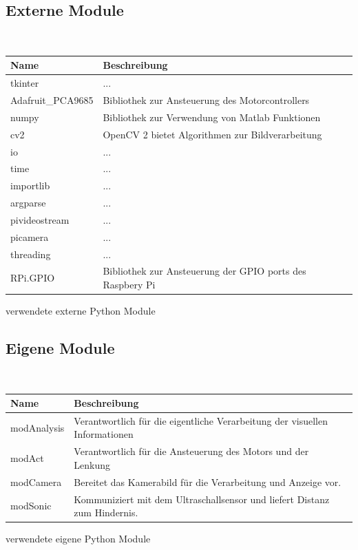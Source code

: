 \documentclass[a4paper,12pt]{article}
\begin{document}
    \subsection{Externe Module}
    \ \\
    \begin{minipage}{\columnwidth}
      \makeatletter
      \def\@captype{table}
      \makeatother
      \centering
      \begin{tabular}{ l | l }
      Name & Beschreibung \\ \hline \hline
      tkinter & ... \\
      Adafruit\_PCA9685 & Bibliothek zur Ansteuerung des Motorcontrollers \\
      numpy & Bibliothek zur Verwendung von Matlab Funktionen \\
      cv2 & OpenCV 2 bietet Algorithmen zur Bildverarbeitung \\
      io & ... \\
      time & ... \\
      importlib & ... \\
      argparse & ... \\
      pivideostream & ... \\
      picamera & ... \\
      threading & ... \\
      RPi.GPIO & Bibliothek zur Ansteuerung der GPIO ports des Raspbery Pi \\
      \end{tabular}
      \caption{verwendete externe Python Module}
      \label{tab:01}
    \end{minipage}
    
    \subsection{Eigene Module}
    \ \\
    \begin{minipage}{\columnwidth}
      \makeatletter
      \def\@captype{table}
      \makeatother
      \centering
      \begin{tabular}{ l | l }
      Name & Beschreibung \\ \hline \hline
      modAnalysis & Verantwortlich für die eigentliche Verarbeitung der visuellen Informationen \\
      modAct & Verantwortlich für die Ansteuerung des Motors und der Lenkung \\
      modCamera & Bereitet das Kamerabild für die Verarbeitung und Anzeige vor. \\
      modSonic & Kommuniziert mit dem Ultraschallsensor und liefert Distanz zum Hindernis.\\
      \end{tabular}
      \caption{verwendete eigene Python Module}
      \label{tab:01}
    \end{minipage}
\end{document}
